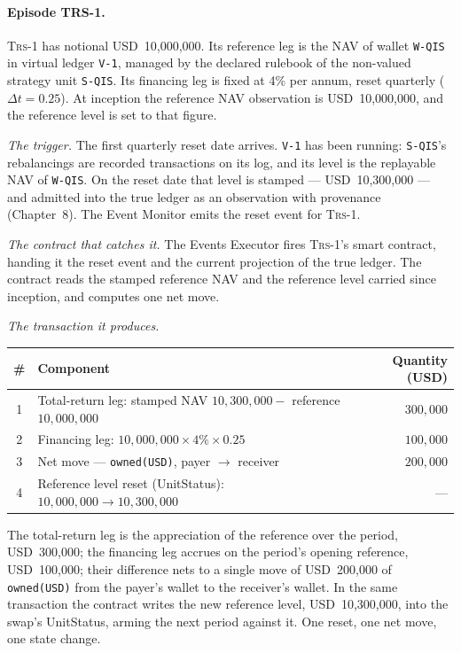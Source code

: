 \documentclass[11pt,a4paper]{article}
\newcommand{\USD}[1]{\mbox{USD~#1}}
\begin{document}
\paragraph{Episode TRS-1.} \textsc{Trs-1} has notional \USD{10{,}000{,}000}. Its
reference leg is the NAV of wallet \texttt{W-QIS} in virtual ledger \texttt{V-1},
managed by the declared rulebook of the non-valued strategy unit \texttt{S-QIS}.
Its financing leg is fixed at 4\% per annum, reset quarterly ($\Delta t = 0.25$).
At inception the reference NAV observation is \USD{10{,}000{,}000}, and the
reference level is set to that figure.

\emph{The trigger.} The first quarterly reset date arrives. \texttt{V-1} has been
running: \texttt{S-QIS}'s rebalancings are recorded transactions on its log, and
its level is the replayable NAV of \texttt{W-QIS}. On the reset date that level is
stamped --- \USD{10{,}300{,}000} --- and admitted into the true ledger as an
observation with provenance (Chapter~8). The Event Monitor emits the reset event
for \textsc{Trs-1}.

\emph{The contract that catches it.} The Events Executor fires \textsc{Trs-1}'s
smart contract, handing it the reset event and the current projection of the true
ledger. The contract reads the stamped reference NAV and the reference level
carried since inception, and computes one net move.

\emph{The transaction it produces.}

\begin{center}
\begin{tabular}{clr}
\toprule
\# & Component & Quantity (USD) \\
\midrule
1 & Total-return leg: stamped NAV $10{,}300{,}000 - $ reference $10{,}000{,}000$ & $300{,}000$ \\
2 & Financing leg: $10{,}000{,}000 \times 4\% \times 0.25$                       & $100{,}000$ \\
3 & Net move --- \texttt{owned(USD)}, payer $\rightarrow$ receiver               & $200{,}000$ \\
4 & Reference level reset (UnitStatus): $10{,}000{,}000 \rightarrow 10{,}300{,}000$ & --- \\
\bottomrule
\end{tabular}
\end{center}

The total-return leg is the appreciation of the reference over the period,
\USD{300{,}000}; the financing leg accrues on the period's opening reference,
\USD{100{,}000}; their difference nets to a single move of \USD{200{,}000} of
\texttt{owned(USD)} from the payer's wallet to the receiver's wallet. In the same
transaction the contract writes the new reference level, \USD{10{,}300{,}000},
into the swap's UnitStatus, arming the next period against it. One reset, one net
move, one state change.
\end{document}
